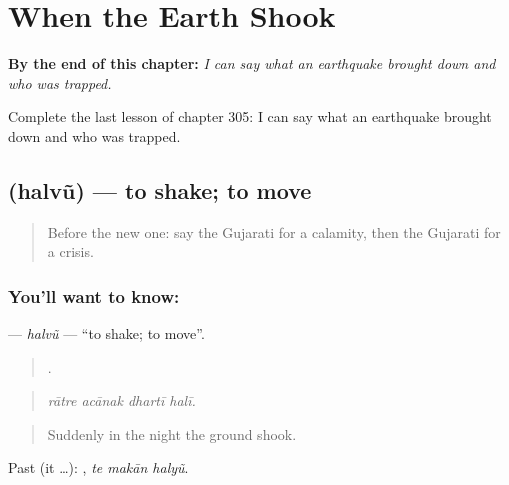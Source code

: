 
\chapter{When the Earth Shook}
\label{ch:gu-when-the-earth-shook}

\begin{chapteropening}
\textbf{By the end of this chapter:} \emph{I can say what an earthquake brought down and who was trapped.}

Complete the last lesson of chapter 305: I can say what an earthquake brought down and who was trapped.
\end{chapteropening}

\section[\texorpdfstring{\gu{હલવું} (halvũ)}{હલવું (halvũ)}]{ (halvũ) — to shake; to move}

\label{lesson:GU-C305-halvu}



\begin{quote}
Before the new one: say the Gujarati for a calamity, then the Gujarati for a crisis.
\end{quote}

\subsection*{You'll want to know: }
\textbf{} — \emph{halvũ} — \textquotedblleft{}to shake; to move\textquotedblright{}.

\begin{quote}
   .
\end{quote}

\begin{quote}
\emph{rātre acānak dhartī halī.}
\end{quote}

\begin{quote}
Suddenly in the night the ground shook.
\end{quote}

Past (it …):   , \emph{te makān halyũ}.


